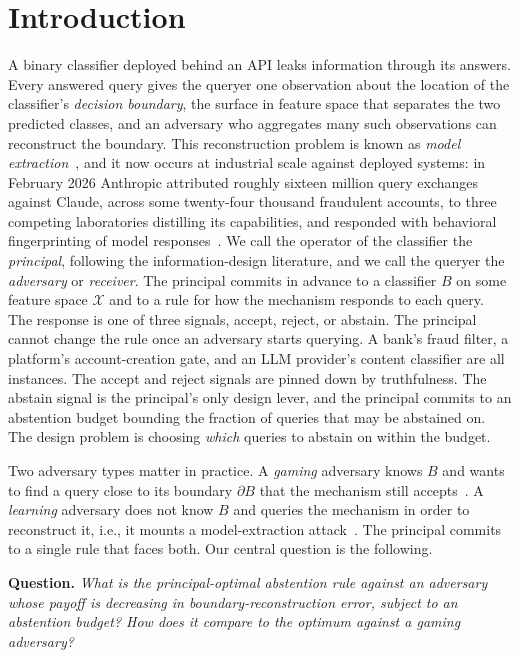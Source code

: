 \documentclass[runningheads,envcountsame]{llncs}
\newcommand{\cX}{\mathcal{X}}
\begin{document}
\section{Introduction}
\label{sec:intro}
A binary classifier deployed behind an API leaks information through its answers. Every answered query gives the queryer one observation about the location of the classifier's \emph{decision boundary}, the surface in feature space that separates the two predicted classes, and an adversary who aggregates many such observations can reconstruct the boundary. This reconstruction problem is known as \emph{model extraction}~\cite{tramer2016stealing}, and it now occurs at industrial scale against deployed systems: in February 2026 Anthropic attributed roughly sixteen million query exchanges against Claude, across some twenty-four thousand fraudulent accounts, to three competing laboratories distilling its capabilities, and responded with behavioral fingerprinting of model responses~\cite{anthropic2026distillation}. We call the operator of the classifier the \emph{principal}, following the information-design literature, and we call the queryer the \emph{adversary} or \emph{receiver}. The principal commits in advance to a classifier $B$ on some feature space $\cX$ and to a rule for how the mechanism responds to each query. The response is one of three signals, accept, reject, or abstain. The principal cannot change the rule once an adversary starts querying. A bank's fraud filter, a platform's account-creation gate, and an LLM provider's content classifier are all instances.
The accept and reject signals are pinned down by truthfulness. The abstain signal is the principal's only design lever, and the principal commits to an abstention budget bounding the fraction of queries that may be abstained on. The design problem is choosing \emph{which} queries to abstain on within the budget.

Two adversary types matter in practice. A \emph{gaming} adversary knows $B$ and wants to find a query close to its boundary $\partial B$ that the mechanism still accepts~\cite{hardt2016strategic}. A \emph{learning} adversary does not know $B$ and queries the mechanism in order to reconstruct it, i.e., it mounts a model-extraction attack~\cite{tramer2016stealing}. The principal commits to a single rule that faces both. Our central question is the following.

\begin{mdframed}
\textbf{Question.} \emph{What is the principal-optimal abstention rule against an adversary whose payoff is decreasing in boundary-reconstruction error, subject to an abstention budget? How does it compare to the optimum against a gaming adversary?}
\end{mdframed}
\end{document}
